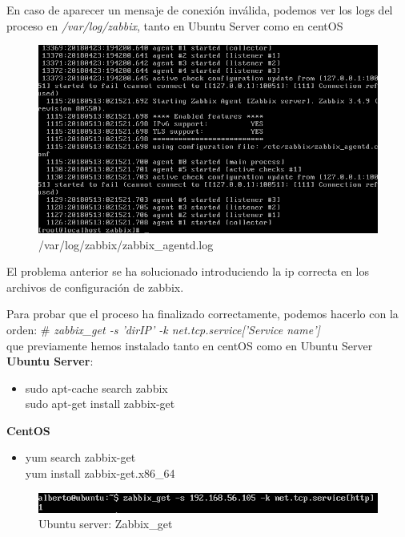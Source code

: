 En caso de aparecer un mensaje de conexión inválida, podemos ver los logs del proceso en \textit{/var/log/zabbix}, tanto en Ubuntu Server como en centOS


\begin{figure}[h]
	\centering
	\includegraphics[scale=0.4]{images/b.png}
	\caption{/var/log/zabbix/zabbix\_agentd.log}
\end{figure}

El problema anterior se ha solucionado introduciendo la ip correcta en los archivos de configuración de zabbix.

Para probar que el proceso ha finalizado correctamente, podemos hacerlo con la orden:
\# \textit{zabbix\_get -s 'dirIP' -k net.tcp.service['Service name']} \\
que previamente hemos instalado tanto en centOS como en Ubuntu Server \\

\textbf{Ubuntu Server}: 
\begin{itemize}
	\item sudo apt-cache search zabbix \\
	 sudo apt-get install zabbix-get
\end{itemize} 

\textbf{CentOS}
\begin{itemize}
	\item yum search zabbix-get \\ yum install zabbix-get.x86\_64
\end{itemize} 


\begin{figure}[h]
	\centering
	\includegraphics[scale=0.5]{images/final.png}
	\caption{Ubuntu server: Zabbix\_get}
\end{figure}


